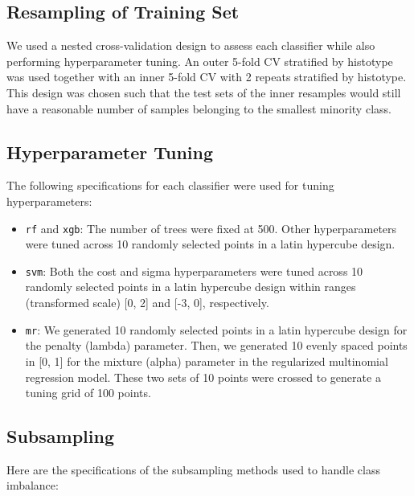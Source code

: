 \documentclass[
]{report}
\providecommand{\tightlist}{%
  \setlength{\itemsep}{0pt}\setlength{\parskip}{0pt}}
\begin{document}
\hypertarget{resampling-of-training-set}{%
\subsection{Resampling of Training Set}\label{resampling-of-training-set}}

We used a nested cross-validation design to assess each classifier while also performing hyperparameter tuning. An outer 5-fold CV stratified by histotype was used together with an inner 5-fold CV with 2 repeats stratified by histotype. This design was chosen such that the test sets of the inner resamples would still have a reasonable number of samples belonging to the smallest minority class.

\hypertarget{hyperparameter-tuning}{%
\subsection{Hyperparameter Tuning}\label{hyperparameter-tuning}}

The following specifications for each classifier were used for tuning hyperparameters:

\begin{itemize}
\tightlist
\item
  \texttt{rf} and \texttt{xgb}: The number of trees were fixed at 500. Other hyperparameters were tuned across 10 randomly selected points in a latin hypercube design.
\item
  \texttt{svm}: Both the cost and sigma hyperparameters were tuned across 10 randomly selected points in a latin hypercube design within ranges (transformed scale) {[}0, 2{]} and {[}-3, 0{]}, respectively.
\item
  \texttt{mr}: We generated 10 randomly selected points in a latin hypercube design for the penalty (lambda) parameter. Then, we generated 10 evenly spaced points in {[}0, 1{]} for the mixture (alpha) parameter in the regularized multinomial regression model. These two sets of 10 points were crossed to generate a tuning grid of 100 points.
\end{itemize}

\hypertarget{subsampling}{%
\subsection{Subsampling}\label{subsampling}}

Here are the specifications of the subsampling methods used to handle class imbalance:
\end{document}
